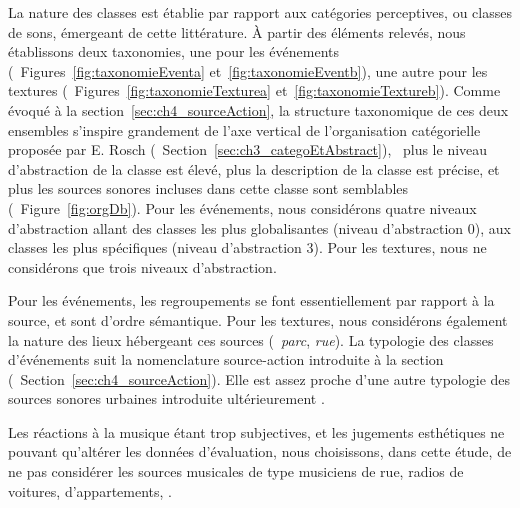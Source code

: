 La nature des classes est établie par rapport aux catégories perceptives, ou classes de sons, émergeant de cette littérature. À partir des éléments relevés, nous établissons deux taxonomies, une pour les événements (\cf~Figures~\ref{fig:taxonomieEventa} et~\ref{fig:taxonomieEventb}), une autre pour les textures (\cf~Figures~\ref{fig:taxonomieTexturea} et~\ref{fig:taxonomieTextureb}). Comme évoqué à la section~\ref{sec:ch4_sourceAction}, la structure taxonomique de ces deux ensembles s'inspire grandement de l'axe vertical de l'organisation catégorielle proposée par E. Rosch (\cf~Section~\ref{sec:ch3_categoEtAbstract}), \ie~plus le niveau d'abstraction de la classe est élevé, plus la description de la classe est précise, et plus les sources sonores incluses dans cette classe sont semblables (\cf~Figure~\ref{fig:orgDb}). Pour les événements, nous considérons quatre niveaux d'abstraction allant des classes les plus globalisantes (niveau d'abstraction 0), aux classes les plus spécifiques (niveau d'abstraction 3). Pour les textures, nous ne considérons que trois niveaux d'abstraction.

Pour les événements, les regroupements se font essentiellement par rapport à la source, et sont d’ordre sémantique. Pour les textures, nous considérons également la nature des lieux hébergeant ces sources (\eg~\emph{parc}, \emph{rue}). La typologie des classes d'événements suit la nomenclature source-action introduite à la section (\cf~Section~\ref{sec:ch4_sourceAction}). Elle est assez proche d'une autre typologie des sources sonores urbaines introduite ultérieurement \citep{Salamon14}.

Les réactions à la musique étant trop subjectives, et les jugements esthétiques ne pouvant qu'altérer les données d'évaluation, nous choisissons, dans cette étude, de ne pas considérer les sources musicales de type musiciens de rue, radios de voitures, d'appartements, \etc. 
 
